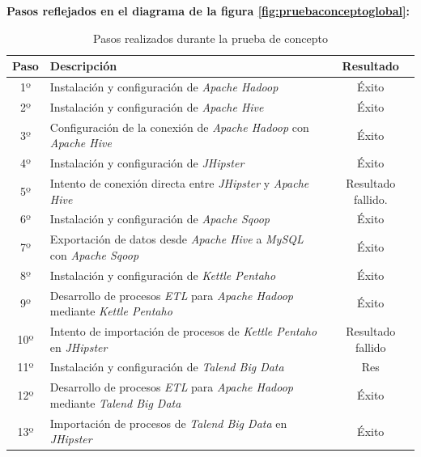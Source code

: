 \par

\textbf{Pasos reflejados en el diagrama de la figura \ref{fig:pruebaconceptoglobal}:}


\begin{table}[H]
\centering
\bgroup
\def\arraystretch{1.3}
\begin{tabular}{c p{280pt} c}
\toprule
\textbf{Paso} & \textbf{Descripción} & \textbf{Resultado} \\
 \midrule
 1º
& 
Instalación y configuración de \textit{Apache Hadoop}
& 
Éxito
 \\
 2º
& 
Instalación y configuración de \textit{Apache Hive}
& 
Éxito
 \\
 3º
& 
Configuración de la conexión de \textit{Apache Hadoop} con \textit{Apache Hive}
& 
Éxito
 \\
 4º
& 
Instalación y configuración de \textit{JHipster}
& 
Éxito
 \\
 5º
& 
Intento de conexión directa entre \textit{JHipster} y \textit{Apache Hive}
& 
Resultado fallido.
 \\
 6º
& 
Instalación y configuración de \textit{Apache Sqoop}
& 
Éxito
 \\
 7º
& 
Exportación de datos desde \textit{Apache Hive} a \textit{MySQL} con \textit{Apache Sqoop}
& 
Éxito
 \\
 8º
& 
Instalación y configuración de \textit{Kettle Pentaho}
& 
Éxito
 \\
 9º
& 
Desarrollo de procesos \textit{ETL} para \textit{Apache Hadoop} mediante \textit{Kettle Pentaho}
& 
Éxito
 \\
 10º
& 
Intento de importación de procesos de \textit{Kettle Pentaho} en \textit{JHipster}
& 
Resultado fallido
 \\
 11º
& 
Instalación y configuración de\textit{ Talend Big Data}
& 
Res
 \\
 12º
& 
Desarrollo de procesos \textit{ETL} para \textit{Apache Hadoop }mediante \textit{Talend Big Data}
& 
Éxito
 \\
 13º
& 
Importación de procesos de \textit{Talend Big Data} en \textit{JHipster}
& 
Éxito
 \\
\bottomrule
\end{tabular}
\egroup
\caption{Pasos realizados durante la prueba de concepto}
\label{tab:pasos_prueba_de_concepto}
\end{table}


\par
